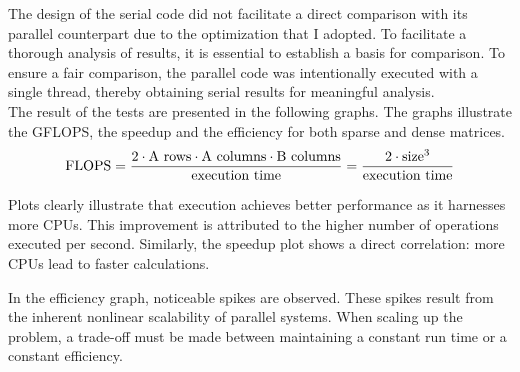\documentclass{article}
\begin{document}
The design of the serial code did not facilitate a direct comparison with its parallel counterpart due to the optimization that I adopted. To facilitate a thorough analysis of results, it is essential to establish a basis for comparison. To ensure a fair comparison, the parallel code was intentionally executed with a single thread, thereby obtaining serial results for meaningful analysis.\\
The result of the tests are presented in the following graphs. The graphs illustrate the GFLOPS, the speedup and the efficiency for both sparse and dense matrices.
\begin{equation}
    \label{eq:flops}
    \textnormal{FLOPS}=\frac{%
            2 \cdot \textnormal{A rows} \cdot \textnormal{A columns} \cdot %
            \textnormal{B columns}
        }{\textnormal{execution time}}=
        \frac{%
            2 \cdot \textnormal{size}^3}{\textnormal{execution time}}
\end{equation}

Plots clearly illustrate that execution achieves better performance as it harnesses more CPUs. This improvement is attributed to the higher number of operations executed per second. Similarly, the speedup plot shows a direct correlation: more CPUs lead to faster calculations.

In the efficiency graph, noticeable spikes are observed. These spikes result from the inherent nonlinear scalability of parallel systems. When scaling up the problem, a trade-off must be made between maintaining a constant run time or a constant efficiency.



\clearpage
\end{document}
